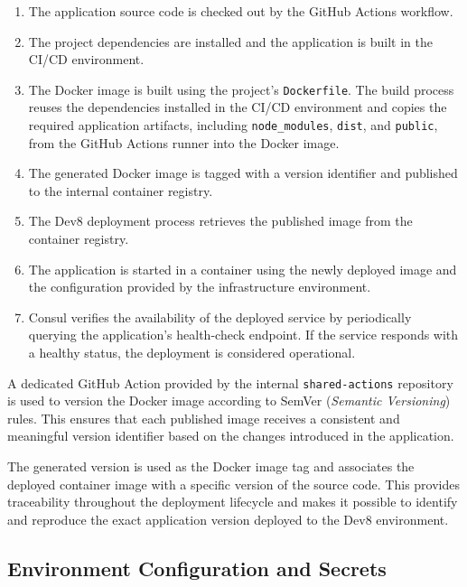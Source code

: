 \begin{enumerate}

    \item The application source code is checked out by the GitHub Actions workflow.

    \item The project dependencies are installed and the application is built in the CI/CD environment.

    \item The Docker image is built using the project's \texttt{Dockerfile}. The build process reuses the dependencies installed in the CI/CD environment and copies the required application artifacts, including \texttt{node\_modules}, \texttt{dist}, and \texttt{public}, from the GitHub Actions runner into the Docker image.

    \item The generated Docker image is tagged with a version identifier and published to the internal container registry.

    \item The Dev8 deployment process retrieves the published image from the container registry.

    \item The application is started in a container using the newly deployed image and the configuration provided by the infrastructure environment.

    \item Consul verifies the availability of the deployed service by periodically querying the application's health-check endpoint. If the service responds with a healthy status, the deployment is considered operational.

\end{enumerate}

A dedicated GitHub Action provided by the internal \texttt{shared-actions} repository is used to version the Docker image according to \ac{SemVer} (\textit{Semantic Versioning}) rules. This ensures that each published image receives a consistent and meaningful version identifier based on the changes introduced in the application.

The generated version is used as the Docker image tag and associates the deployed container image with a specific version of the source code. This provides traceability throughout the deployment lifecycle and makes it possible to identify and reproduce the exact application version deployed to the Dev8 environment.

\subsection{Environment Configuration and Secrets}

